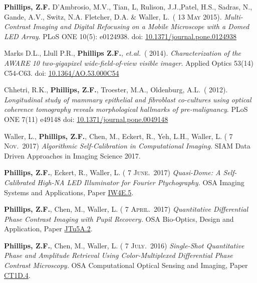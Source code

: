 \documentclass[12pt,letterpaper]{article}
\newcommand{\mhead}[1]{\leavevmode\marginpar{\sffamily\footnotesize #1}}
\renewcommand{\date}[1]{{} #1}
\begin{document}
\medskip
\textbf{Phillips, Z.F.} D'Ambrosio, M.V., Tian, L, Rulison, J.J.,Patel, H.S., Sadras, N., Gande, A.V., Switz, N.A. Fletcher, D.A. \& Waller, L.~(\date{13 \textsc{May} 2015}).
\emph{Multi-Contrast Imaging and Digital Refocusing on a Mobile Microscope with a Domed LED Array}.
PLoS ONE 10(5): e0124938. doi: \href{http://journals.plos.org/plosone/article?id=10.1371/journal.pone.0124938}{10.1371/journal.pone.0124938}

\medskip
\par Marks D.L., Llull P.R., \textbf{Phillips Z.F.}, \textit{et.al.}~(\date{2014}).
\emph{Characterization of the AWARE 10 two-gigapixel wide-field-of-view visible imager}.
Applied Optics 53(14) C54-C63. doi: \href{https://www.osapublishing.org/ao/abstract.cfm?uri=ao-53-13-C54}{10.1364/AO.53.000C54}

\medskip
Chhetri, R.K., \textbf{Phillips, Z.F.}, Troester, M.A., Oldenburg, A.L.~(\date{2012}).
\emph{Longitudinal study of mammary epithelial and fibroblast co-cultures using optical coherence tomography reveals morphological hallmarks of pre-malignancy}.
PLoS ONE 7(11) e49148 doi: \href{http://journals.plos.org/plosone/article?id=10.1371/journal.pone.0049148}{10.1371/journal.pone.0049148}
\medskip

\medskip
\mhead{Talks}%

Waller, L., \textbf{Phillips, Z.F.}, Chen, M., Eckert, R., Yeh, L.H., Waller, L. (\date{7 \textsc{Nov.}~2017})
\emph{Algorithmic Self-Calibration in Computational Imaging.} SIAM Data Driven Approaches in Imaging Science 2017.
\medskip

\textbf{Phillips, Z.F.}, Eckert, R., Waller, L. (\date{7 \textsc{June.}~2017})
\emph{Quasi-Dome: A Self-Calibrated High-NA LED Illuminator for Fourier Ptychography.} OSA Imaging Systems and Applications, Paper \href{https://www.osapublishing.org/abstract.cfm?uri=COSI-2016-CT1D.4}{IW4E.5}.
\medskip

\textbf{Phillips, Z.F.}, Chen, M., Waller, L. (\date{7 \textsc{April.}~2017})
\emph{Quantitative Differential Phase Contrast Imaging with Pupil Recovery.} OSA Bio-Optics, Design and Application, Paper \href{https://www.osapublishing.org/abstract.cfm?uri=BODA-2017-JTu5A.2}{JTu5A.2}.
\medskip

\textbf{Phillips, Z.F.}, Chen, M., Waller, L. (\date{7 \textsc{July.}~2016})
\emph{Single-Shot Quantitative Phase and Amplitude Retrieval Using Color-Multiplexed Differential Phase Contrast Microscopy.} OSA Computational Optical Sensing and Imaging, Paper \href{https://www.osapublishing.org/abstract.cfm?uri=COSI-2016-CT1D.4}{CT1D.4}.
\medskip
\end{document}
